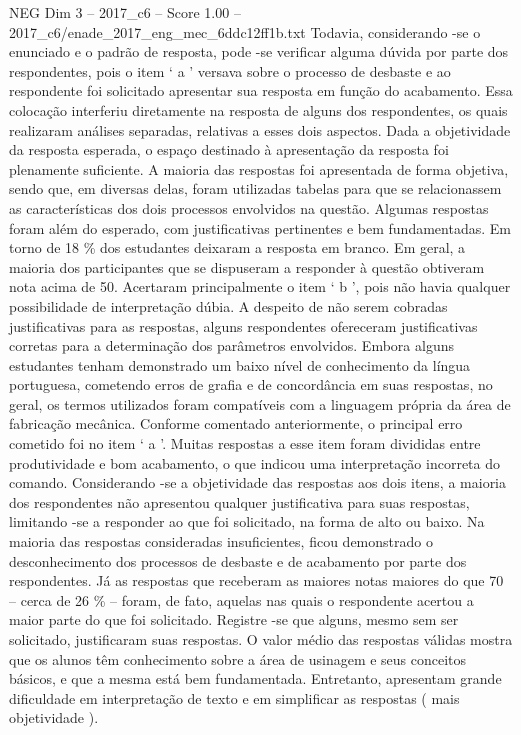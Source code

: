 \begin{textsample}{NEG Dim 3 – 2017\_c6 – Score 1.00 – 2017\_c6/enade\_2017\_eng\_mec\_6ddc12ff1b.txt}
Todavia, considerando -se o enunciado e o padrão de resposta, pode -se verificar alguma dúvida por parte dos respondentes, pois o item ‘ a ’ versava sobre o processo de desbaste e ao respondente foi solicitado apresentar sua resposta em função do acabamento.
Essa colocação interferiu diretamente na resposta de alguns dos respondentes, os quais realizaram análises separadas, relativas a esses dois aspectos.
Dada a objetividade da resposta esperada, o espaço destinado à apresentação da resposta foi plenamente suficiente.
A maioria das respostas foi apresentada de forma objetiva, sendo que, em diversas delas, foram utilizadas tabelas para que se relacionassem as características dos dois processos envolvidos na questão.
Algumas respostas foram além do esperado, com justificativas pertinentes e bem fundamentadas.
Em torno de 18 \% dos estudantes deixaram a resposta em branco.
Em geral, a maioria dos participantes que se dispuseram a responder à questão obtiveram nota acima de 50.
Acertaram principalmente o item ‘ b ’, pois não havia qualquer possibilidade de interpretação dúbia.
A despeito de não serem cobradas justificativas para as respostas, alguns respondentes ofereceram justificativas corretas para a determinação dos parâmetros envolvidos.
Embora alguns estudantes tenham demonstrado um baixo nível de conhecimento da língua portuguesa, cometendo erros de grafia e de concordância em suas respostas, no geral, os termos utilizados foram compatíveis com a linguagem própria da área de fabricação mecânica.
Conforme comentado anteriormente, o principal erro cometido foi no item ‘ a ’.
Muitas respostas a esse item foram divididas entre produtividade e bom acabamento, o que indicou uma interpretação incorreta do comando.
Considerando -se a objetividade das respostas aos dois itens, a maioria dos respondentes não apresentou qualquer justificativa para suas respostas, limitando -se a responder ao que foi solicitado, na forma de alto ou baixo.
Na maioria das respostas consideradas insuficientes, ficou demonstrado o desconhecimento dos processos de desbaste e de acabamento por parte dos respondentes.
Já as respostas que receberam as maiores notas maiores do que 70 – cerca de 26 \% – foram, de fato, aquelas nas quais o respondente acertou a maior parte do que foi solicitado.
Registre -se que alguns, mesmo sem ser solicitado, justificaram suas respostas.
O valor médio das respostas válidas mostra que os alunos têm conhecimento sobre a área de usinagem e seus conceitos básicos, e que a mesma está bem fundamentada.
Entretanto, apresentam grande dificuldade em interpretação de texto e em simplificar as respostas ( mais objetividade ).

\end{textsample}
